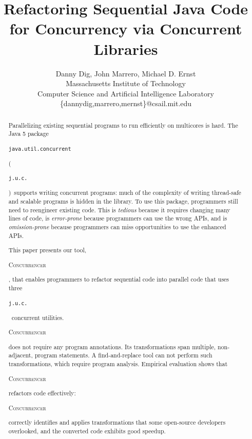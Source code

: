 \documentclass[10pt,twocolumn]{article}
\newcommand\Feedback[1]{#1}
\newcommand{\tool}{\begin{scriptsize}\textsc{Concurrencer}\end{scriptsize}\xspace}
\newcommand{\code}[1]{\begin{smaller}\texttt{#1}\end{smaller}}
\begin{document}
\title{Refactoring Sequential Java Code for Concurrency via Concurrent
Libraries}

\author{Danny Dig, John Marrero, Michael D. Ernst\\
Massachusetts Institute of Technology\\ Computer Science and Artificial
Intelligence Laboratory \\ \{dannydig,marrero,mernst\}@csail.mit.edu\\
}

\maketitle
\thispagestyle{empty}

\begin{abstract}
Parallelizing existing sequential programs to run efficiently on multicores is
hard.  The Java 5 package
\code{java.util.concurrent} (\code{j.u.c.})\ supports writing concurrent
programs: much of the complexity of writing thread-safe and scalable programs is hidden in the
library. To use this package, programmers still need to reengineer
existing code. This is \emph{tedious} because it requires changing many lines
of code, is \emph{error-prone} because programmers can use the wrong APIs,
and is \emph{omission-prone} because programmers can miss opportunities to
use the enhanced APIs.

This paper presents our tool, \tool, that enables programmers to refactor
sequential code into parallel code that uses \Feedback{three} \code{j.u.c.}\
concurrent utilities. \tool does not require any program annotations. Its
transformations span multiple, non-adjacent, program statements. A
find-and-replace tool can not perform such transformations, which require
program analysis. Empirical evaluation shows that \tool refactors code
effectively: \tool correctly identifies and applies transformations that some
open-source developers overlooked, and the converted code exhibits good speedup.


% 


\end{abstract}
\end{document}
